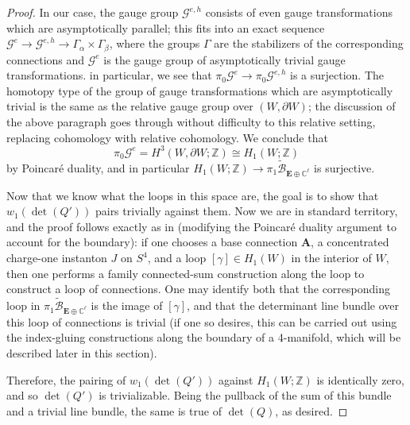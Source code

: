 \documentclass[10pt,a4paper]{amsart}
\theoremstyle{definition}
\theoremstyle{remark}
\numberwithin{figure}{qchap}
\begin{document}
\begin{proof}
In our case, the gauge group $\mathcal G^{e,h}$ consists of even gauge transformations which are asymptotically parallel; this fits into an exact sequence $\mathcal G^e \to \mathcal G^{e,h} \to \Gamma_\alpha \times \Gamma_\beta$, where the groups $\Gamma$ are the stabilizers of the corresponding connections and $\mathcal G^e$ is the gauge group of asymptotically trivial gauge transformations. in particular, we see that $\pi_0 \mathcal G^e \to \pi_0 \mathcal G^{e,h}$ is a surjection. The homotopy type of the group of gauge transformations which are asymptotically trivial is the same as the relative gauge group over $(W, \partial W)$; the discussion of the above paragraph goes through without difficulty to this relative setting, replacing cohomology with relative cohomology. We conclude that 
$$\pi_0 \mathcal G^e = H^3(W, \partial W; \mathbb Z) \cong H_1(W;\mathbb Z)$$ 
by Poincar\'e duality, and in particular $H_1(W;\mathbb Z) \to \pi_1 \widetilde{\mathcal B}_{\mathbf{E} \oplus \mathbb C^\ell}$ is surjective.

Now that we know what the loops in this space are, the goal is to show that $w_1(\det(Q'))$ pairs trivially against them. Now we are in standard territory, and the proof follows exactly as in \cite[Lemma~3.23]{donaldson1987orientation} (modifying the Poincar\'e duality argument to account for the boundary): if one chooses a base connection $\mathbf{A}$, a concentrated charge-one instanton $J$ on $S^4$, and a loop $[\gamma] \in H_1(W)$ in the interior of $W$, then one performs a family connected-sum construction along the loop to construct a loop of connections. One may identify both that the corresponding loop in $\pi_1 \widetilde{\mathcal B}_{\mathbf{E} \oplus \mathbb C^\ell}$ is the image of $[\gamma]$, and that the determinant line bundle over this loop of connections is trivial (if one so desires, this can be carried out using the index-gluing constructions along the boundary of a 4-manifold, which will be described later in this section).

Therefore, the pairing of $w_1(\det(Q'))$ against $H_1(W;\mathbb Z)$ is identically zero, and so $\det(Q')$ is trivializable. Being the pullback of the sum of this bundle and a trivial line bundle, the same is true of $\det(Q)$, as desired.
\end{proof}
\end{document}
